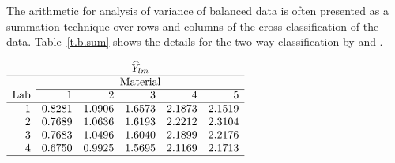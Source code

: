 The arithmetic for analysis of variance of balanced data is often
presented as a summation technique over rows and columns of the
cross-classification of the data.  Table~\ref{t.b.sum} shows the
details for the two-way classification by  and
.

\begin{table}[tbp]
\label{t.b.sum}
\mbox{}\hrulefill\mbox{}

\begin{center}
$
\begin{array}{r rrrrr}
    & \multicolumn{5}{c}{\widehat Y_{lm}} \\
\hline
    &	\multicolumn{5}{c}{\mbox{Material}} \\
	\cline{2-6}
\mbox{Lab}& 1&	     2&       3&       4&	5 \\
\hline
   1&  0.8281&	1.0906&  1.6573&  2.1873&  2.1519 \\
   2&  0.7689&	1.0636&  1.6193&  2.2212&  2.3104 \\
   3&  0.7683&	1.0496&  1.6040&  2.1899&  2.2176 \\
   4&  0.6750&	0.9925&  1.5695&  2.1169&  2.1713 \\
\hline
\end{array}
$
\end{center}


\end{table}
